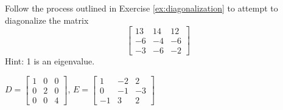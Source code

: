 \begin{exercise}
Follow the process outlined in Exercise \ref{ex:diagonalization} to attempt to diagonalize the matrix
\[ \begin{bmatrix} 13 & 14 & 12 \\ -6 & -4 & -6 \\ -3 & -6 & -2 \end{bmatrix}\] Hint: 1 is an eigenvalue. 
\end{exercise}\comboSol{%
}
{%
$D = \left[\begin{smallmatrix} 1 & 0 & 0 \\ 0 & 2 & 0 \\ 0 & 0 & 4 \end{smallmatrix}\right]$, $E = \left[\begin{smallmatrix} 1 & -2 & 2 \\ 0 & -1 & -3 \\-1 & 3 & 2 \end{smallmatrix}\right]$
}

